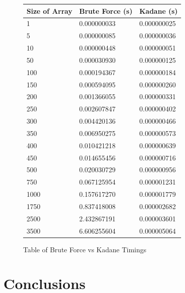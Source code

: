 \documentclass[10pt, letterpaper]{article}
\begin{document}
	\begin{figure}[!htb]
	\begin{center}
	\caption{
		\label{fig:time-table} Table of Brute Force vs Kadane Timings
	}
	\medskip
	\begin{tabular}{ | p{2cm} | l | l | }
			\hline
			Size of Array & Brute Force (s) & Kadane (s) \\ \hline
			1 & 0.000000033 & 0.000000025 \\ \hline
			5 & 0.000000085 & 0.000000036 \\ \hline
			10 & 0.000000448 & 0.000000051 \\ \hline
			50 & 0.000030930 & 0.000000125 \\ \hline
			100 & 0.000194367 & 0.000000184 \\ \hline
			150 & 0.000594095 & 0.000000260 \\ \hline
			200 & 0.001366055 & 0.000000331 \\ \hline
			250 & 0.002607847 & 0.000000402 \\ \hline
			300 & 0.004420136 & 0.000000466 \\ \hline
			350 & 0.006950275 & 0.000000573 \\ \hline
			400 & 0.010421218 & 0.000000639 \\ \hline
			450 & 0.014655456 & 0.000000716 \\ \hline
			500 & 0.020030729 & 0.000000956 \\ \hline
			750 & 0.067125954 & 0.000001231 \\ \hline
			1000 & 0.157617270 & 0.000001779 \\ \hline
			1750 & 0.837418008 & 0.000002682 \\ \hline
			2500 & 2.432867191 & 0.000003601 \\ \hline
			3500 & 6.606255604 & 0.000005064 \\ \hline
		\end{tabular}
	\end{center}
\end{figure}
	\section{Conclusions}
\end{document}
